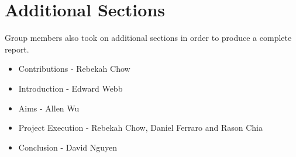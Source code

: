\section{Additional Sections}
Group members also took on additional sections in order to produce a complete report.

\begin{itemize}
    \item Contributions - Rebekah Chow
    \item Introduction - Edward Webb
    \item Aims - Allen Wu
    \item Project Execution - Rebekah Chow, Daniel Ferraro and Rason Chia
    \item Conclusion - David Nguyen
\end{itemize}